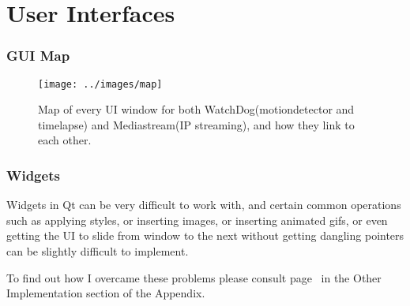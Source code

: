 %
%
%
%
%

\vspace{-20pt}
\part{User Interfaces}\label{userinterfaces}
\vspace{-20pt}
\section{GUI Map}\label{guimap}
\begin{figure}[H]
	\vspace{-20pt}
	\begin{center}
		\texttt{[image: ../images/map]}
		\label{img:map}
	\end{center}
	\vspace{-30pt}
	\caption{Map of every UI window for both WatchDog(motiondetector and timelapse) and Mediastream(IP streaming), and how they link to each other.}
\end{figure}

\section{Widgets}

Widgets in Qt can be very difficult to work with, and certain common operations such as applying styles, or inserting images, or inserting animated gifs, or even getting the UI to slide from window to the next without getting dangling pointers can be slightly difficult to implement.

To find out how I overcame these problems please consult page~\pageref{widgetstuff} in the Other Implementation section of the Appendix.

